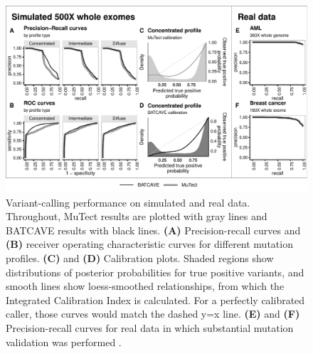 \documentclass[a4,center,fleqn]{NAR}
\newcommand{\batcave}{BATCAVE\xspace}
\begin{document}

  \begin{figure}
\centering
    \includegraphics[width=\textwidth]{figures/fig_wes.pdf}
    \caption{Variant-calling performance on  simulated and real data. Throughout, MuTect results are plotted with gray lines and \batcave results with black lines.
    \textbf{(A)} Precision-recall curves and \textbf{(B)} receiver operating characteristic curves for different mutation profiles.
    \textbf{(C)} and \textbf{(D)} Calibration plots. Shaded regions show distributions of posterior probabilities for true positive variants, and smooth lines show loess-smoothed relationships, from which the Integrated Calibration Index is calculated. For a perfectly calibrated caller, those curves would match the dashed y=x line. 
    \textbf{(E)} and \textbf{(F)} Precision-recall curves for real data in which substantial mutation validation was performed \cite{Griffith2015,Shi2018}.
}
  \label{NAR-wes_fig}
  \end{figure}
  
\end{document}
